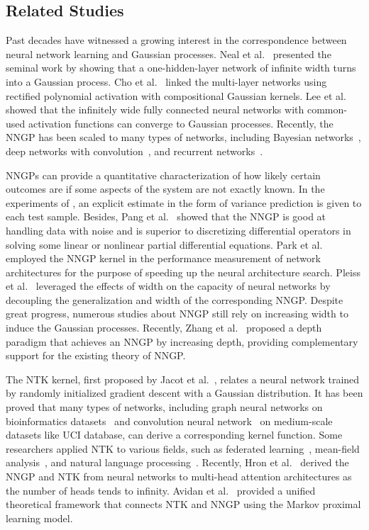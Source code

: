 \documentclass[review,10pt]{JMtemplate}
\begin{document}
\subsection{Related Studies}  \label{subsec:rw}
Past decades have witnessed a growing interest in the correspondence between neural network learning and Gaussian processes. Neal et al.~\citep{neal1996:GP} presented the seminal work by showing that a one-hidden-layer network of infinite width turns into a Gaussian process. Cho et al.~\citep{cho2009:GP} linked the multi-layer networks using rectified polynomial activation with compositional Gaussian kernels. Lee et al.~\citep{lee2018:NNGP} showed that the infinitely wide fully connected neural networks with common-used activation functions can converge to Gaussian processes. Recently, the NNGP has been scaled to many types of networks, including Bayesian networks~\citep{novak2018:GP}, deep networks with convolution~\citep{garriga2019:GP}, and recurrent networks~\citep{yang2019:GP}. 

NNGPs can provide a quantitative characterization of how likely certain outcomes are if some aspects of the system are not exactly known. In the experiments of \citep{lee2018:NNGP}, an explicit estimate in the form of variance prediction is given to each test sample. Besides, Pang et al.~\citep{pang2019:NNGP} showed that the NNGP is good at handling data with noise and is superior to discretizing differential operators in solving some linear or nonlinear partial differential equations. Park et al.~\citep{park2020:NNGP} employed the NNGP kernel in the performance measurement of network architectures for the purpose of speeding up the neural architecture search. Pleiss et al.~\citep{pleiss2022:NNGP} leveraged the effects of width on the capacity of neural networks by decoupling the generalization and width of the corresponding NNGP. Despite great progress, numerous studies about NNGP still rely on increasing width to induce the Gaussian processes. Recently, Zhang et al.~\citep{zhang2022:NNGP} proposed a depth paradigm that achieves an NNGP by increasing depth, providing complementary support for the existing theory of NNGP.  

The NTK kernel, first proposed by Jacot et al.~\citep{jacot2018:NTK}, relates a neural network trained by randomly initialized gradient descent with a Gaussian distribution. It has been proved that many types of networks, including graph neural networks on bioinformatics datasets~\citep{du2019:GNTK} and convolution neural network~\citep{arora2019:NTK} on medium-scale datasets like UCI database, can derive a corresponding kernel function. Some researchers applied NTK to various fields, such as federated learning~\citep{huang2021:NTK}, mean-field analysis~\citep{mahankali2023:NTK}, and natural language processing~\citep{malladi2023:NTK}. Recently, Hron et al.~\citep{hron2020:attention} derived the NNGP and NTK from neural networks to multi-head attention architectures as the number of heads tends to infinity. Avidan et al.~\citep{avidan2023:connecting} provided a unified theoretical framework that connects NTK and NNGP using the Markov proximal learning model.
\end{document}

